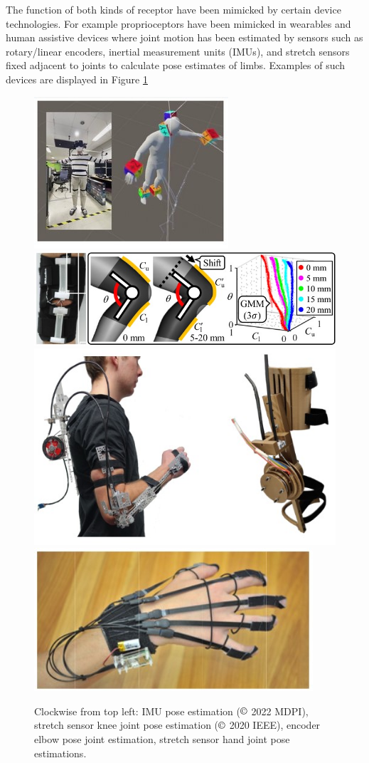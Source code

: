The function of both kinds of receptor have been mimicked by certain device technologies. For example proprioceptors have been mimicked in wearables and human assistive devices where joint motion has been estimated by sensors such as rotary/linear encoders, inertial measurement units (IMUs), and stretch sensors fixed adjacent to joints to calculate pose estimates of limbs\cite{OBrien2014,Eguchi2020,Chatfield2021,Kim2022}. Examples of such devices are displayed in Figure \ref{fig:proprio-tech}
\begin{figure}[H]
    \centering
    \includegraphics[width=0.4\linewidth]{Figures/imu-pose-tracker-kim2022.jpg} %
    \includegraphics[width=0.4\linewidth]{Figures/knee-stretch-sense-eguchi2020.jpg} %
    \includegraphics[width=0.4\linewidth]{Figures/logan-assitive-arm-device.jpg}
    \includegraphics[width=0.4\linewidth]{Figures/stretch-sense-OBrien2014.jpg}
    \caption{Clockwise from top left: IMU pose estimation\cite{Kim2022} ($\copyright$ 2022 MDPI), stretch sensor knee joint pose estimation\cite{Eguchi2020} ($\copyright$ 2020 IEEE), encoder elbow pose joint estimation\cite{Chatfield2021}, stretch sensor hand joint pose estimations\cite{OBrien2014}.}
    \label{fig:proprio-tech}
\end{figure}
